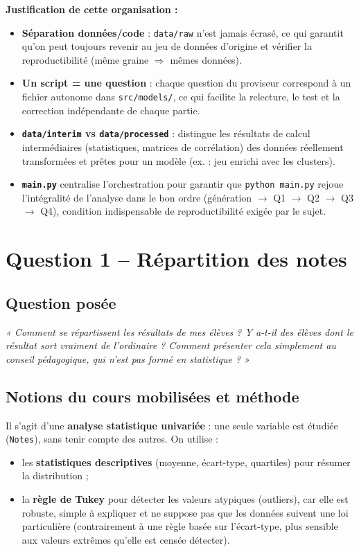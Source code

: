 \documentclass[11pt,a4paper]{article}
\begin{document}
\textbf{Justification de cette organisation :}
\begin{itemize}
\item \textbf{Séparation données/code} : \texttt{data/raw} n'est jamais écrasé, ce qui
garantit qu'on peut toujours revenir au jeu de données d'origine et vérifier la
reproductibilité (même graine $\Rightarrow$ mêmes données).
\item \textbf{Un script = une question} : chaque question du proviseur correspond à un
fichier autonome dans \texttt{src/models/}, ce qui facilite la relecture, le test et la
correction indépendante de chaque partie.
\item \textbf{\texttt{data/interim} vs \texttt{data/processed}} : distingue les résultats
de calcul intermédiaires (statistiques, matrices de corrélation) des données réellement
transformées et prêtes pour un modèle (ex. : jeu enrichi avec les clusters).
\item \textbf{\texttt{main.py}} centralise l'orchestration pour garantir que
\texttt{python main.py} rejoue l'intégralité de l'analyse dans le bon ordre
(génération $\rightarrow$ Q1 $\rightarrow$ Q2 $\rightarrow$ Q3 $\rightarrow$ Q4), condition
indispensable de reproductibilité exigée par le sujet.
\end{itemize}

\section{Question 1 -- Répartition des notes}

\subsection{Question posée}
\textit{« Comment se répartissent les résultats de mes élèves ? Y a-t-il des élèves dont
le résultat sort vraiment de l'ordinaire ? Comment présenter cela simplement au conseil
pédagogique, qui n'est pas formé en statistique ? »}

\subsection{Notions du cours mobilisées et méthode}

Il s'agit d'une \textbf{analyse statistique univariée} : une seule variable est étudiée
(\texttt{Notes}), sans tenir compte des autres. On utilise :
\begin{itemize}
\item les \textbf{statistiques descriptives} (moyenne, écart-type, quartiles) pour
résumer la distribution ;
\item la \textbf{règle de Tukey} pour détecter les valeurs atypiques (outliers), car elle
est robuste, simple à expliquer et ne suppose pas que les données suivent une loi
particulière (contrairement à une règle basée sur l'écart-type, plus sensible aux
valeurs extrêmes qu'elle est censée détecter).
\end{itemize}
\end{document}
